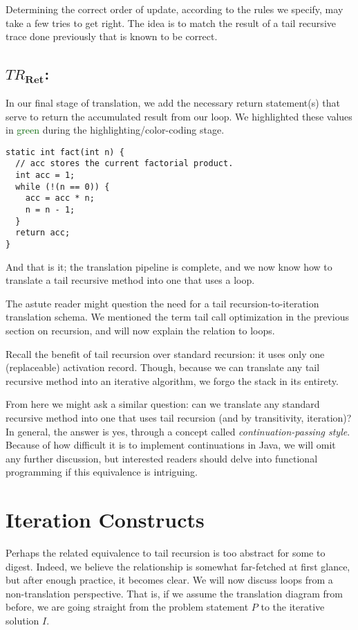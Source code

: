 Determining the correct order of update, according to the rules we specify, may take a few tries to get right. The idea is to match the result of a tail recursive trace done previously that is known to be correct.

\subsection{\emph{$TR_\mathbf{Ret}$}:}
In our final stage of translation, we add the necessary return statement(s) that serve to return the accumulated result from our loop. We highlighted these values in \textcolor{darkgreen}{green} during the highlighting/color-coding stage.
\begin{lstlisting}[language=MyJava]
static int fact(int n) {
  // acc stores the current factorial product. 
  int acc = 1;
  while (!(n == 0)) { 
    acc = acc * n;
    n = n - 1;
  }
  return acc;
}
\end{lstlisting}

And that is it; the translation pipeline is complete, and we now know how to translate a tail recursive method into one that uses a loop.

The astute reader might question the need for a tail recursion-to-iteration translation schema. We mentioned the term tail call optimization in the previous section on recursion, and will now explain the relation to loops.

Recall the benefit of tail recursion over standard recursion: it uses only one (replaceable) activation record. Though, because we can translate any tail recursive method into an iterative algorithm, we forgo the stack in its entirety.

From here we might ask a similar question: can we translate any standard recursive method into one that uses tail recursion (and by transitivity, iteration)? In general, the answer is yes, through a concept called \emph{continuation-passing style}. Because of how difficult it is to implement continuations in Java, we will omit any further discussion, but interested readers should delve into functional programming if this equivalence is intriguing.

\section{Iteration Constructs}

Perhaps the related equivalence to tail recursion is too abstract for some to digest. Indeed, we believe the relationship is somewhat far-fetched at first glance, but after enough practice, it becomes clear. We will now discuss loops from a non-translation perspective. That is, if we assume the translation diagram from before, we are going straight from the problem statement $P$ to the iterative solution $I$.

